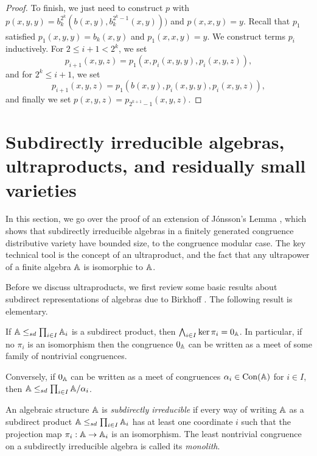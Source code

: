 \begin{appendices}
\begin{proof}
To finish, we just need to construct $p$ with $p(x,y,y) = b_k^{2^k}(b(x,y),b_k^{2^k-1}(x,y)))$ and $p(x,x,y) = y$. Recall that $p_1$ satisfied $p_1(x,y,y) = b_k(x,y)$ and $p_1(x,x,y) = y$. We construct terms $p_i$ inductively. For $2 \le i+1 < 2^k$, we set
\[
p_{i+1}(x,y,z) = p_1(x,p_i(x,y,y),p_i(x,y,z)),
\]
and for $2^k \le i+1$, we set
\[
p_{i+1}(x,y,z) = p_1(b(x,y),p_i(x,y,y),p_i(x,y,z)),
\]
and finally we set $p(x,y,z) = p_{2^{k+1}-1}(x,y,z)$.
\end{proof}



\section{Subdirectly irreducible algebras, ultraproducts, and residually small varieties}\label{s-subdirectly-irred}

In this section, we go over the proof of an extension of J\'onsson's Lemma \cite{jonsson-distributive}, which shows that subdirectly irreducible algebras in a finitely generated congruence distributive variety have bounded size, to the congruence modular case. The key technical tool is the concept of an ultraproduct, and the fact that any ultrapower of a finite algebra $\mathbb{A}$ is isomorphic to $\mathbb{A}$.

Before we discuss ultraproducts, we first review some basic results about subdirect representations of algebras due to Birkhoff \cite{birkhoff-subdirect}. The following result is elementary.

\begin{prop} If $\mathbb{A} \le_{sd} \prod_{i \in I} \mathbb{A}_i$ is a subdirect product, then $\bigwedge_{i \in I} \ker \pi_i = 0_{\mathbb{A}}$. In particular, if no $\pi_i$ is an isomorphism then the congruence $0_{\mathbb{A}}$ can be written as a meet of some family of nontrivial congruences.

Conversely, if $0_{\mathbb{A}}$ can be written as a meet of congruences $\alpha_i \in \operatorname{Con}(\mathbb{A})$ for $i \in I$, then $\mathbb{A} \le_{sd} \prod_{i \in I} \mathbb{A}/\alpha_i$.
\end{prop}

\begin{defn} An algebraic structure $\mathbb{A}$ is \emph{subdirectly irreducible} if every way of writing $\mathbb{A}$ as a subdirect product $\mathbb{A} \le_{sd} \prod_{i \in I} \mathbb{A}_i$ has at least one coordinate $i$ such that the projection map $\pi_i : \mathbb{A} \rightarrow \mathbb{A}_i$ is an isomorphism. The least nontrivial congruence on a subdirectly irreducible algebra is called its \emph{monolith}.
\end{defn}


\end{appendices}
